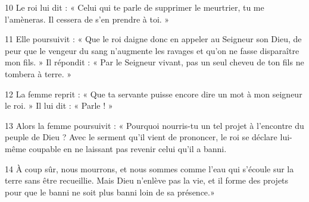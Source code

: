 
10 Le roi lui dit : « Celui qui te parle de supprimer le meurtrier, tu me l’amèneras. Il cessera de s’en prendre à toi. »

11 Elle poursuivit : « Que le roi daigne donc en appeler au Seigneur son Dieu, de peur que le vengeur du sang n’augmente les ravages et qu’on ne fasse disparaître mon fils. » Il répondit : « Par le Seigneur vivant, pas un seul cheveu de ton fils ne tombera à terre. »

12 La femme reprit : « Que ta servante puisse encore dire un mot à mon seigneur le roi. » Il lui dit : « Parle ! »

13 Alors la femme poursuivit : « Pourquoi nourris-tu un tel projet à l’encontre du peuple de Dieu ? Avec le serment qu’il vient de prononcer, le roi se déclare lui-même coupable en ne laissant pas revenir celui qu’il a banni.

14 À coup sûr, nous mourrons, et nous sommes comme l’eau qui s’écoule sur la terre sans être recueillie. Mais Dieu n’enlève pas la vie, et il forme des projets pour que le banni ne soit plus banni loin de sa présence.»
